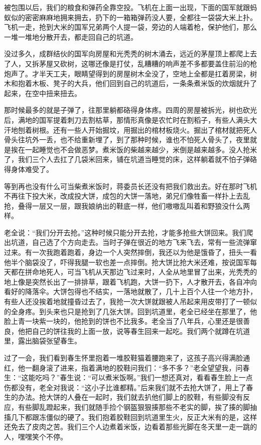 \documentclass[12pt,UTF8]{ctexbook}
\begin{document}
被包围以后，我们的粮食和弹药全靠空投。飞机在上面一出现，下面的国军就跟蚂蚁似的密密麻麻地拥来拥去，扔下的一箱箱弹药没人要，全都往一袋袋大米上扑。飞机一走，抢到大米的国军兄弟两个人提一袋，旁边的人端着枪，保护他们，那么一堆一堆地分散开去，都走回自己的坑道。

没过多久，成群结伙的国军向房屋和光秃秃的树木涌去，远近的茅屋顶上都爬上去了人，又拆茅屋又砍树，这哪还像是打仗，乱糟糟的响声差不多都要盖住前沿的枪炮声了。才半天工夫，眼睛望得到的房屋树木全没了，空地上全都是扛着房梁，树木和抱着木板、凳子的大兵，他们回到自己的坑道后，一条条煮米饭的炊烟就升了起来，在空中扭来扭去。

那时候最多的就是子弹了，往那里躺都硌得身体疼。四周的房屋被拆光，树也砍光后，满地的国军提着刺刀去割枯草，那情形真像是农忙时在割稻子，有些人满头大汗地刨着树根。还有一些人开始掘坟，用掘出的棺材板烧火。掘出了棺材就把死人骨头往坑外一丢，也不给重新埋了，到了那种时候，谁也不怕死人骨头了，夜里就是挨在一起睡觉也不会做恶梦。煮米饭的柴越来越少，米倒是越来越多。没人抢米了，我们三个人去扛了几袋米回来，铺在坑道当睡觉的床，这样躺着就不怕子弹硌得身体难受了。

等到再也没有什么可当柴煮米饭时，蒋委员长还没有把我们救出去。好在那时飞机不再往下投大米，改成投大饼，成包的大饼一落地，弟兄们像牲畜一样扑上去乱抢，叠得一层又一层，跟我娘纳出的鞋底一样，他们嗷嗷乱叫着和野狼没什么两样。

老全说：“我们分开去抢。”这种时候只能分开去抢，才能多抢些大饼回来。我们爬出坑道，自己选了个方向走去。当时子弹在很近的地方飞来飞去，常有一些流弹窜过来。有一次我跑着跑着，身边一个人突然摔倒，我还以为他是饿昏了，扭头一看他半个脑袋没了，吓得我腿一软也差一点摔倒。抢大饼比抢大米还难，按说国军每天都在拼命地死人，可当飞机从天那边飞过来时，人全从地里冒了出来，光秃秃的地上像是突然长出了一排排草，跟着飞机跑，大饼一扔下，人才散开去，各自冲向看好的降落伞。大饼包得也不结实，一落地就散了，几十上百个人往一个地方扑，有些人还没挨着地就撞昏过去了，我抢一次大饼就跟被人吊起来用皮带打了一顿似的全身疼。到头来也只是抢到了几张大饼。回到坑道里，老全已经坐在那里了，他脸上青一块紫一块的，他抢到的饼也不比我多。老全当了八年兵，心里还是很善良，他把自己的饼往我的上面一放，说等春生回来一起吃。我们两个就蹲在坑道里，露出脑袋张望春生。

过了一会，我们看到春生怀里抱着一堆胶鞋猫着腰跑来了，这孩子高兴得满脸通红，他一翻身滚了进来，指着满地的胶鞋问我们：“多不多？”老全望望我，问春生：“这能吃吗？”春生说：“可以煮米饭啊。”我们一想还真对，看看春生脸上一点伤都没有，老全对我说：“这小子比谁都精。”后来我们就不去抢大饼了，用上了春生的办法。抢大饼的人叠在一起时，我们就去扒他们脚上的胶鞋，有些脚没有反应，有些脚乱蹬起来，我们就随手捡个钢盔狠狠揍那些不老实的脚，挨了揍的脚抽搐几下都跟冻僵似的硬了。我们抱着胶鞋回到坑道里生火，反正大米有的是，这样还免去了皮肉之苦。我们三个人边煮着米饭，边看着那些光脚在冬天里一走一跳的人，嘿嘿笑个不停。
\end{document}
